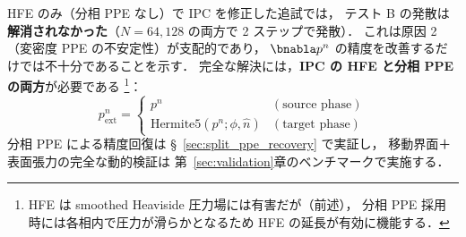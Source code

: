 HFE のみ（分相 PPE なし）で IPC を修正した追試では，
テスト B の発散は\textbf{解消されなかった}（$N = 64, 128$ の両方で 2 ステップで発散）．
これは原因 2（変密度 PPE の不安定性）が支配的であり，
$\bnabla p^n$ の精度を改善するだけでは不十分であることを示す．
完全な解決には，\textbf{IPC の HFE と分相 PPE の両方}が必要である%
\footnote{HFE は smoothed Heaviside 圧力場には有害だが（前述），
分相 PPE 採用時には各相内で圧力が滑らかとなるため HFE の延長が有効に機能する．}：
\begin{equation}
  p^n_{\text{ext}} = \begin{cases}
    p^n & (\text{source phase}) \\
    \text{Hermite5}(p^n; \phi, \hat{n}) & (\text{target phase})
  \end{cases}
  \label{eq:p_extension_ipc}
\end{equation}
分相 PPE による精度回復は §~\ref{sec:split_ppe_recovery} で実証し，
移動界面＋表面張力の完全な動的検証は
第~\ref{sec:validation}章のベンチマークで実施する．
